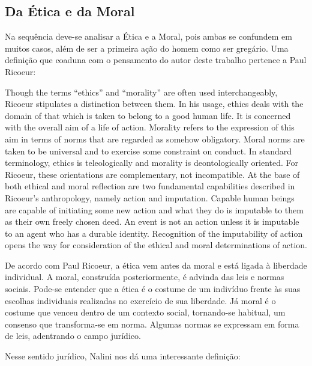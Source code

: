 \documentclass[
	12pt,				%
	openright,			%
	twoside,			%
	a4paper,			%
	chapter=TITLE,		%
	section=TITLE,		%
	subsection=TITLE,	%
	subsubsection=TITLE,%
	spanish,            %
	english,			%
	brazil				%
	]{abntex2}
\begin{document}
\subsection{Da Ética e da Moral}

Na sequência deve-se analisar a Ética e a Moral, pois ambas se confundem em muitos casos, além de ser a primeira ação do homem como ser gregário. Uma definição que coaduna com o pensamento do autor deste trabalho pertence a Paul Ricoeur:
\begin{citacao}[english]
	 Though the terms “ethics” and “morality” are often used interchangeably, Ricoeur stipulates a distinction between them. In his usage, ethics deals with the domain of that which is taken to belong to a good human life. It is concerned with the overall aim of a life of action. Morality refers to the expression of this aim in terms of norms that are regarded as somehow obligatory. Moral norms are taken to be universal and to exercise some constraint on conduct. In standard terminology, ethics is teleologically and morality is deontologically oriented. For Ricoeur, these orientations are complementary, not incompatible.
	 At the base of both ethical and moral reflection are two fundamental capabilities described in Ricoeur's anthropology, namely action and imputation. Capable human beings are capable of initiating some new action and what they do is imputable to them as their own freely chosen deed. An event is not an action unless it is imputable to an agent who has a durable identity. Recognition of the imputability of action opens the way for consideration of the ethical and moral determinations of action.\cite{sep-ricoeur}
	\end{citacao}
\par
De acordo com Paul Ricoeur, a ética vem antes da moral e está ligada à liberdade individual. A moral, construída posteriormente, é advinda das leis e normas sociais. Pode-se entender que a ética é o costume de um indivíduo frente às suas escolhas individuais realizadas no exercício de sua liberdade. Já moral é o costume que venceu dentro de um contexto social, tornando-se habitual, um consenso que transforma-se em norma. Algumas normas se expressam em forma de leis, adentrando o campo jurídico.
\par
Nesse sentido jurídico, Nalini nos dá uma interessante definição:
\end{document}
